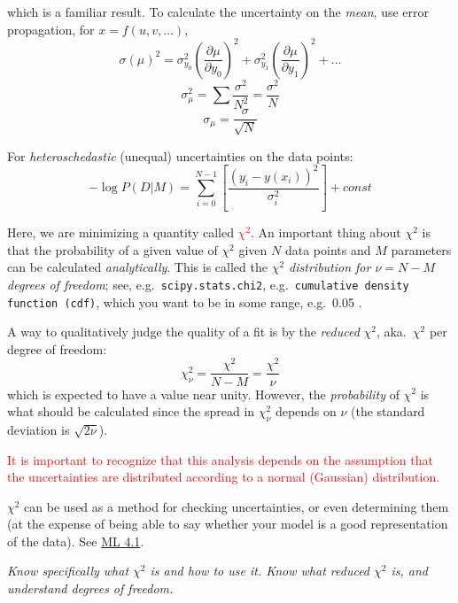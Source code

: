 \documentclass[12pt]{article}
\begin{document}
which is a familiar result. To calculate the uncertainty on the
\emph{mean}, use error propagation, for $x=f(u,v,\ldots)$,
    $$ \sigma(\mu)^2 = \sigma_{y_0}^2
    \left( \frac{\partial{\mu}}{\partial{y}_0}\right)^2
    + \sigma_{y_1}^2
    \left( \frac{\partial{\mu}}{\partial{y}_1}\right)^2
    + \ldots $$
    $$ \sigma_{\mu}^{2} = \sum\frac{\sigma^{2}}{N^{2}} = \frac{\sigma^{2}}{N}$$
    $$ \sigma_{\mu} = \frac{\sigma}{\sqrt{N}} $$

For \emph{heteroschedastic} (unequal) uncertainties on the data points:
$$ -\log P(D|M) = \sum_{i=0}^{N-1}\left[
\frac{(y_i-y(x_i))^{2}}{\sigma_{i}^{2}}\right] + const $$

Here, we are minimizing a quantity called \textcolor{red}
{$\chi^2$}. An important thing about $\chi^2$ is that the probability
of a given value of $\chi^2$ given $N$ data points and $M$ parameters
can be calculated \emph{analytically}. This is called the
\emph{$\chi^2$ distribution for $\nu = N-M$ degrees of freedom};
see, e.g.\ \texttt{scipy.stats.chi2}, e.g.\ \texttt{cumulative
density function (cdf)}, which you want to be in some range, e.g.\
0.05 .

A way to qualitatively judge the quality of a fit is by the
\emph{reduced} $\chi^2$, aka.\ $\chi^2$ per degree of freedom:
    $$  \chi_{\nu}^2 = \frac{\chi^2}{N-M} = \frac{\chi^2}{\nu}    $$
which is expected to have a value near unity.
However, the \emph{probability} of $\chi^2$ is what should be calculated since the
spread in $\chi_{\nu}^2$ depends on $\nu$ (the standard deviation
is $\sqrt{2\nu}$).

\textcolor{red}{It is important to recognize that this analysis depends
on the assumption that the uncertainties are distributed according to
a normal (Gaussian) distribution.}

$\chi^2$ can be used as a method for checking uncertainties, or even
determining them (at the expense of being able to say whether your
model is a good representation of the data).
See \href{http://astronomy.nmsu.edu/holtz/a575/images/ML4.1.png}
{ML 4.1}.

\colorbox{hl}{\parbox{0.9\textwidth}
{\emph{Know specifically what $\chi^2$ is and how to use it.
Know what reduced $\chi^2$ is, and understand degrees
of freedom.
}}}
\end{document}
